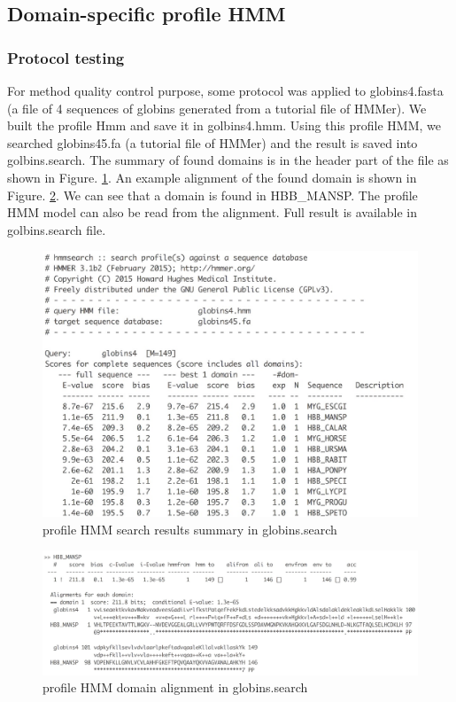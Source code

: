 \documentclass[11pt, oneside]{article}
\begin{document}
\subsection{Domain-specific profile HMM}

\subsubsection{Protocol testing}

For method quality control purpose, some protocol was applied to globins4.fasta (a file of 4 sequences of globins generated from a tutorial file of HMMer). We built the profile Hmm and save it in golbins4.hmm. Using this profile HMM, we searched globins45.fa (a tutorial file of HMMer) and the result is saved into golbins.search. The summary of found domains is in the header part of the file as shown in Figure. \ref{hmm_test1}.  An example alignment of the found domain is shown in Figure. \ref{hmm_test2}. We can see that a domain is found in HBB\_MANSP. The profile HMM model can also be read from the alignment. Full result is available in golbins.search file.

\begin{figure}[ht]
  \centering
  \includegraphics[scale = 0.35]{images/hmm_test1}
      \caption{profile HMM search results summary in globins.search}
      \label{hmm_test1}
\end{figure} 

\begin{figure}[ht]
  \centering
  \includegraphics[scale = 0.3]{images/hmm_test2}
      \caption{profile HMM domain alignment in globins.search}
      \label{hmm_test2}
\end{figure} 
\end{document}
